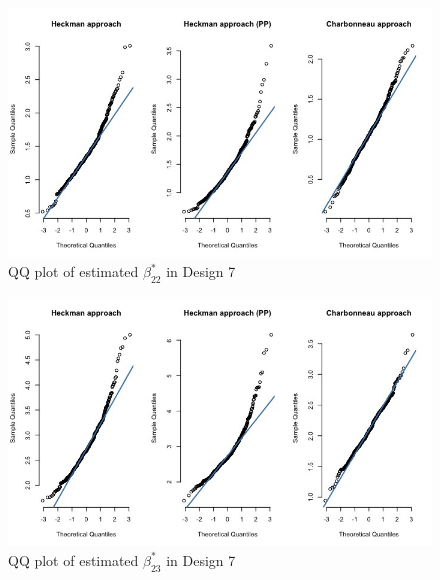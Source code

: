 \begin{figure}[htbp]
    \vspace{-2.5em}%
    \begin{adjustwidth}{-.5in}{-.5in}
    \centerline{\includegraphics[scale=.4]{content/Figures/QQ_beta_22_Design7.png}}
    \caption{\footnotesize{QQ plot of estimated $\beta_{22}^*$ in Design 7}}
    \label{QQ_beta_22_Design7}
\end{adjustwidth}
\end{figure}
\begin{figure}[htbp]
    \vspace{-2.5em}%
    \begin{adjustwidth}{-.5in}{-.5in}
    \centerline{\includegraphics[scale=.4]{content/Figures/QQ_beta_23_Design7.png}}
    \caption{\footnotesize{QQ plot of estimated $\beta_{23}^*$ in Design 7}}
    \label{QQ_beta_23_Design7}
\end{adjustwidth}
\end{figure}
\clearpage
